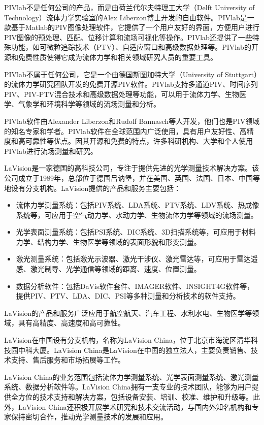 \documentclass[12pt, a4paper, oneside]{ctexart}
\begin{document}
PIVlab不是任何公司的产品，而是由荷兰代尔夫特理工大学（Delft University of Technology）流体力学实验室的Alex Liberzon博士开发的自由软件。PIVlab是一款基于Matlab的PIV图像处理软件，它提供了一个用户友好的界面，方便用户进行PIV图像的预处理、匹配、位移计算和流场可视化等操作。PIVlab还提供了一些特殊功能，如可微粒追踪技术（PTV）、自适应窗口和高级数据处理等。PIVlab的开源和免费性质使得它成为流体力学和相关领域研究人员的重要工具。

PIVlab不属于任何公司，它是一个由德国斯图加特大学（University of Stuttgart）的流体力学研究团队开发的免费开源PIV软件。PIVlab支持多通道PIV、时间序列PIV、PIV-PTV混合技术和高级数据处理等功能，可以用于流体力学、生物医学、气象学和环境科学等领域的流场测量和分析。

PIVlab软件由Alexander Liberzon和Rudolf Bannasch等人开发，他们也是PIV领域的知名专家和学者。PIVlab软件在全球范围内广泛使用，具有用户友好性、高精度和高可靠性等优点。因其开源和免费的特点，许多科研机构、大学和个人使用PIVlab进行流场测量和研究。

LaVision是一家德国的高科技公司，专注于提供先进的光学测量技术解决方案。该公司成立于1989年，总部位于德国吕讷堡，并在美国、英国、法国、日本、中国等地设有分支机构。LaVision提供的产品和服务主要包括：

\begin{itemize}
    \item 流体力学测量系统：包括PIV系统、LDA系统、PTV系统、LDV系统、热成像系统等，可应用于空气动力学、水动力学、生物流体力学等领域的流场测量。
    \item 光学表面测量系统：包括PSI系统、DIC系统、3D扫描系统等，可应用于材料力学、结构力学、生物医学等领域的表面形貌和形变测量。
    \item 激光测量系统：包括激光示波器、激光干涉仪、激光雷达等，可应用于雷达遥感、激光制导、光学通信等领域的距离、速度、位置测量。
    \item 数据分析软件：包括DaVis软件套件、IMAGER软件、INSIGHT4G软件等，提供PIV、PTV、LDA、DIC、PSI等多种测量和分析技术的软件支持。
\end{itemize}


LaVision的产品和服务广泛应用于航空航天、汽车工程、水利水电、生物医学等领域，具有高精度、高速度和高可靠性。

LaVision在中国设有分支机构，名称为LaVision China，位于北京市海淀区清华科技园中科大厦。LaVision China是LaVision在中国的独立法人，主要负责销售、技术支持、售后服务和市场拓展等工作。

LaVision China的业务范围包括流体力学测量系统、光学表面测量系统、激光测量系统、数据分析软件等。LaVision China拥有一支专业的技术团队，能够为用户提供全方位的技术支持和解决方案，包括设备安装、培训、校准、维护和升级等。此外，LaVision China还积极开展学术研究和技术交流活动，与国内外知名机构和专家保持密切合作，推动光学测量技术的发展和应用。
\end{document}
